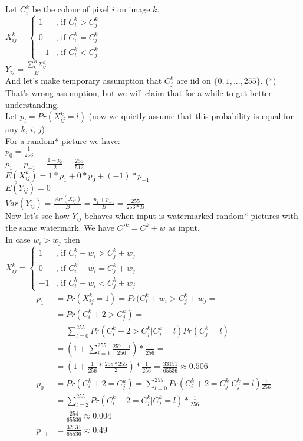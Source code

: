 \documentclass[varwidth]{standalone}
\begin{document}
Let $C^k_i$ be the colour of pixel $i$ on image $k$.\\
$X^k_{ij} =
\left\{
\begin{matrix}
1 & \text{, if } C^k_i > C^k_j\\
0 & \text{, if } C^k_i = C^k_j\\
-1 & \text{, if } C^k_i < C^k_j
\end{matrix}\right.$\\
$Y_{ij} = \frac{\sum^B_k X^k_{ij}}{B}$\\
And let's make temporary assumption that $C^k_j$ are iid on $\{0, 1, ..., 255\}$. (*)\\
That's wrong assumption, but we will claim that for a while to get better understanding.\\
Let $p_l = Pr(X^k_{ij} = l)$
(now we quietly assume that this probability is equal for any $k$, $i$, $j$)\\
For a random* picture we have:\\
$p_0 = \frac{1}{256}$\\
$p_1 = p_{-1} = \frac{1-p_0}{2} = \frac{255}{512}$\\
$E(X^k_{ij}) = 1*p_1 + 0*p_0 + (-1)*p_{-1}$\\
$E(Y_{ij}) = 0$\\
$Var(Y_{ij}) = \frac{Var(X^1_{ij})}{B} = \frac{p_1 + p_{-1}}{B} = \frac{255}{256*B}$\\
Now let's see how $Y_{ij}$ behaves when input is watermarked random* pictures with the same watermark. We have $C'^k = C^k + w$ as input.\\
In case $w_i > w_j$ then\\
$X^k_{ij} =
\left\{
\begin{matrix}
1 & \text{, if } C^k_i + w_i > C^k_j + w_j\\
0 & \text{, if } C^k_i + w_i = C^k_j + w_j\\
-1 & \text{, if } C^k_i + w_i < C^k_j + w_j
\end{matrix}\right.$\\
\begin{align*}
p_1 &= Pr(X^k_{ij} = 1) = Pr(C^k_i + w_i > C^k_j + w_j =\\
    &= Pr(C^k_i + 2 > C^k_j) =\\
    &= \sum_{l=0}^{255} Pr(C^k_i + 2 > C^k_j | C^k_j = l)Pr(C^k_j = l) =\\
    &= (1 + \sum_{i=1}^{255} \frac{257-i}{256})*\frac{1}{256} =\\
    &= (1 + \frac{1}{256}*\frac{258*255}{2})*\frac{1}{256}=\frac{33151}{65536}
        \approx 0.506\\
p_0 &= Pr(C^k_i + 2 = C^k_j) = \sum_{l=0}^{255} Pr(C^k_i + 2 = C^k_j | C^k_j = l)\frac{1}{256}\\
    &= \sum_{l=2}^{255} Pr(C^k_i + 2 = C^k_j | C^k_j = l)*\frac{1}{256}\\
    &= \frac{254}{65536} \approx 0.004\\
p_{-1} &= \frac{32131}{65536} \approx 0.49
\end{align*}\\
\end{document}
